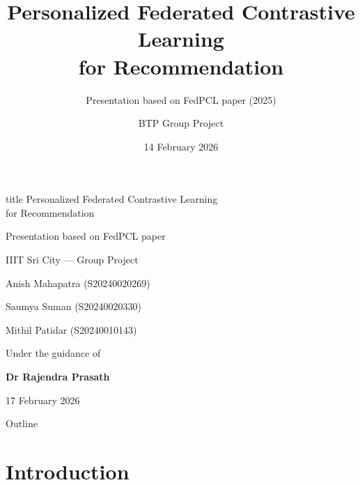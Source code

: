 \documentclass{beamer}
\title[FedPCL for Recommendation]{Personalized Federated Contrastive Learning\\for Recommendation}
\subtitle{Presentation based on FedPCL paper (2025)}
\author{BTP Group Project}
\institute{IIIT Sri City}
\date{14 February 2026}
\begin{document}
\begin{frame}[plain]

\vspace*{0.5cm}
\begin{beamercolorbox}[wd=\paperwidth,ht=2.6cm,center]{title}
    Personalized Federated Contrastive Learning\\
    for Recommendation

    \vspace{0.3cm}
    Presentation based on FedPCL paper
\end{beamercolorbox}

\vspace{0.8cm}

\centering
{\large IIIT Sri City --- Group Project \par}
\vspace{0.4cm}

{\normalsize
Anish Mahapatra (S20240020269) \par
Saumya Suman (S20240020330) \par
Mithil Patidar (S20240010143) \par
}

\vspace{0.5cm}

{\normalsize
Under the guidance of \par
\textbf{Dr Rajendra Prasath} \par
}

\vspace{0.6cm}

{\normalsize 17 February 2026}

\end{frame}

\begin{frame}{Outline}
\tableofcontents
\end{frame}

\section{Introduction}
\end{document}
